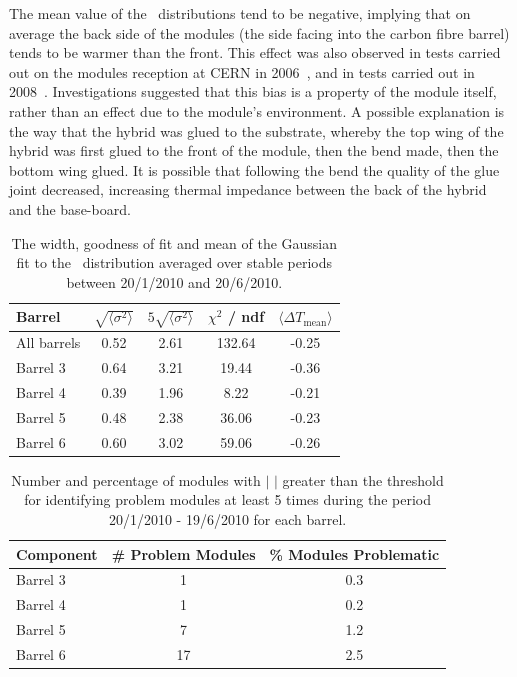 The mean value of the \deltat\ distributions tend to be negative, implying that
on average the back side of the modules (the side facing into the carbon fibre
barrel) tends to be warmer than the front. This effect was also observed in tests
carried out on the modules reception at CERN in 2006~\cite{Viehhauser:2006ix},
and in tests carried out in 2008~\cite{Shaw:1229428}. Investigations suggested
that this bias is a property of the module itself, rather than an effect due to
the module's environment. A possible explanation is the way that the hybrid was
glued to the substrate, whereby the top wing of the hybrid was first glued to the front of the
module, then the bend made, then the bottom wing glued. It is possible that
following the bend the quality of the glue joint decreased, increasing thermal
impedance between the back of the hybrid and the base-board.

\begin{table}
\centering
\begin{tabular}{ l  c  c  c  c }
\hline\hline
Barrel & $\sqrt{\langle \sigma ^ 2 \rangle }$ & $5\sqrt{\langle \sigma ^ 2 \rangle }$ & $\chi ^2 $  / ndf & $\langle \Delta T_{\mathrm{mean}} \rangle$ \\
\hline
All barrels & 0.52 & 2.61 & 132.64 & -0.25\\
Barrel 3 & 0.64 & 3.21 & 19.44 & -0.36 \\
Barrel 4 & 0.39 & 1.96 & 8.22 & -0.21 \\
Barrel 5 & 0.48 & 2.38 & 36.06 & -0.23 \\
Barrel 6 & 0.60 & 3.02 & 59.06 & -0.26 \\
\hline\hline
\end{tabular}
 \caption{The width, goodness of fit and mean of the Gaussian fit to the
 \deltat\ distribution averaged over stable periods between 20/1/2010 and 20/6/2010.}
	\label{table:dt_thresh}

\end{table}

\begin{table}
\centering
 \begin{tabular}{  l  c  c }
\hline\hline
Component & \# Problem Modules & \% Modules Problematic \\
\hline
Barrel 3 & 1 & 0.3 \\
Barrel 4 & 1 & 0.2 \\
Barrel 5 & 7 & 1.2 \\
Barrel 6 & 17 & 2.5 \\
\hline\hline
\end{tabular}
\caption{Number and percentage of modules with $|$ \deltat$|$ greater than the
threshold for identifying problem modules at least 5 times during the period
20/1/2010 - 19/6/2010 for each barrel.}
\label{table:dt_num}
\end{table}

